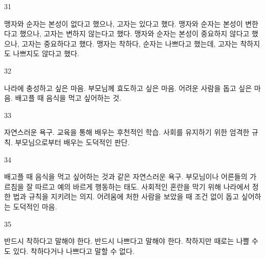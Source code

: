 \documentclass[fs9,seriesFre]{korfarm-base}
\begin{document}
\begin{kfSentenceUnit}{31}{}
\begin{kfChoices}
\kfChoice 맹자와 순자는 본성이 없다고 했으나, 고자는 있다고 했다.
\kfChoice 맹자와 순자는 본성이 변한다고 했으나, 고자는 변하지 않는다고 했다.
\kfChoice 맹자와 순자는 본성이 중요하지 않다고 했으나, 고자는 중요하다고 했다.
\kfChoice 맹자는 착하다, 순자는 나쁘다고 했는데, 고자는 착하지도 나쁘지도 않다고 했다.
\end{kfChoices}
\end{kfSentenceUnit}

\begin{kfSentenceUnit}{32}{}
\begin{kfChoices}
\kfChoice 나라에 충성하고 싶은 마음.
\kfChoice 부모님께 효도하고 싶은 마음.
\kfChoice 어려운 사람을 돕고 싶은 마음.
\kfChoice 배고플 때 음식을 먹고 싶어하는 것.
\end{kfChoices}
\end{kfSentenceUnit}

\begin{kfSentenceUnit}{33}{}
\begin{kfChoices}
\kfChoice 자연스러운 욕구.
\kfChoice 교육을 통해 배우는 후천적인 학습.
\kfChoice 사회를 유지하기 위한 엄격한 규칙.
\kfChoice 부모님으로부터 배우는 도덕적인 판단.
\end{kfChoices}
\end{kfSentenceUnit}

\begin{kfSentenceUnit}{34}{}
\begin{kfChoices}
\kfChoice 배고플 때 음식을 먹고 싶어하는 것과 같은 자연스러운 욕구.
\kfChoice 부모님이나 어른들의 가르침을 잘 따르고 예의 바르게 행동하는 태도.
\kfChoice 사회적인 혼란을 막기 위해 나라에서 정한 법과 규칙을 지키려는 의지.
\kfChoice 어려움에 처한 사람을 보았을 때 조건 없이 돕고 싶어하는 도덕적인 마음.
\end{kfChoices}
\end{kfSentenceUnit}

\begin{kfSentenceUnit}{35}{}
\begin{kfChoices}
\kfChoice 반드시 착하다고 말해야 한다.
\kfChoice 반드시 나쁘다고 말해야 한다.
\kfChoice 착하지만 때로는 나쁠 수도 있다.
\kfChoice 착하다거나 나쁘다고 말할 수 없다.
\end{kfChoices}
\end{kfSentenceUnit}
\end{document}
